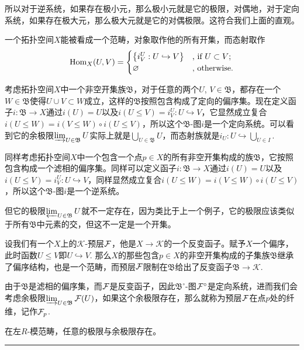 所以对于逆系统，如果存在极小元，那么极小元就是它的极限，对偶地，对于定向系统，如果存在极大元，那么极大元就是它的对偶极限。这符合我们上面的直观。

\para 一个拓扑空间$X$能被看成一个范畴，对象取作他的所有开集，而态射取作
\[
	\operatorname{Hom}_{X}(U,V)=\begin{cases}
	\bigl\{i^U_V:U\hookrightarrow V\bigr\}&\text{, if }U\subset V\text{;}\\
	\varnothing&\text{, otherwise}.
	\end{cases}
\]

考虑拓扑空间$X$中一个非空开集族$\mathfrak{B}$，对于任意的两个$U$, $V\in \mathfrak{B}$，都存在一个$W\in \mathfrak{B}$使得$U\cup V\subset W$成立，这样的$\mathfrak{B}$按照包含构成了定向的偏序集。现在定义函子$i:\mathfrak{B}\to X$通过$i(U)=U$以及$i(U\leq V)=i^U_V:U\hookrightarrow V$，它显然成立复合$i(U\leq W)=i(V\leq W)\circ i(U\leq V)$，所以这个$\mathfrak{B}$-图$i$是一个定向系统。可以看到它的余极限$\varinjlim_{U\in \mathfrak{B}} U$实际上就是$\bigcup_{U\in \mathfrak{B}} U$，而态射族就是$i_U:U\hookrightarrow \bigcup_{U\in I}$.

同样考虑拓扑空间$X$中一个包含一个点$p\in X$的所有非空开集构成的族$\mathfrak{B}$，它按照包含构成一个滤相的偏序集。同样可以定义函子$i:\mathfrak{B}\to X$通过$i(U)=U$以及$i(U\leq V)=i^U_V:U\hookrightarrow V$，同样显然成立复合$i(U\leq W)=i(V\leq W)\circ i(U\leq V)$，所以这个$\mathfrak{B}$-图$i$是一个逆系统。

但它的极限$\varprojlim_{U\in \mathfrak{B}} U$就不一定存在，因为类比于上一个例子，它的极限应该类似于所有$\mathfrak{B}$中元素的交，但这不一定是一个开集。

\para 设我们有一个$X$上的$\mathcal{K}$-预层$\mathcal{F}$，他是$X\to \mathcal{K}$的一个反变函子。赋予$X$一个偏序，此时函数$U\leq V$即$U\hookrightarrow V$. 那么$X$的那些包含$p\in X$的非空开集构成的子集族$\mathfrak{B}$继承了偏序结构，也是一个范畴，而预层$\mathcal{F}$限制在$\mathfrak{B}$给出了反变函子$\mathfrak{B}\to \mathcal{K}$.

由于$\mathfrak{B}$是滤相的偏序集，而$\mathcal{F}$是反变函子，因此$\mathfrak{B}^\circ$-图$\mathcal{F}^\circ$是定向系统，进而我们会考虑余极限$\varinjlim_{U\in \mathfrak{B}} \mathcal{F}(U)$，如果这个余极限存在，那么就称为预层$\mathcal{F}$在点$p$处的纤维，记作$\mathcal{F}_p$.



\theo 在左$R$-模范畴，任意的极限与余极限存在。 \rule{2mm}{2mm}